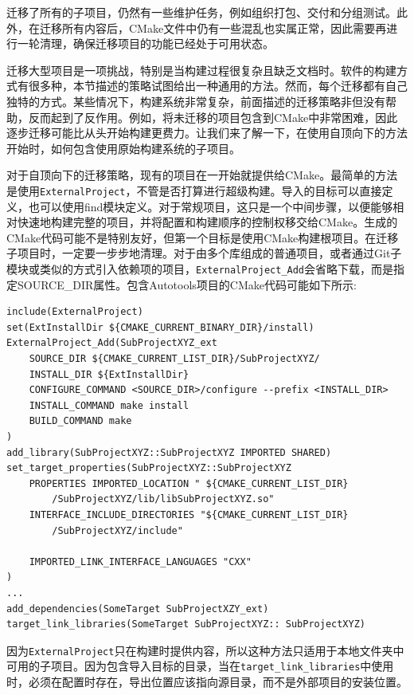 迁移了所有的子项目，仍然有一些维护任务，例如组织打包、交付和分组测试。此外，在迁移所有内容后，CMake文件中仍有一些混乱也实属正常，因此需要再进行一轮清理，确保迁移项目的功能已经处于可用状态。

迁移大型项目是一项挑战，特别是当构建过程很复杂且缺乏文档时。软件的构建方式有很多种，本节描述的策略试图给出一种通用的方法。然而，每个迁移都有自己独特的方式。某些情况下，构建系统非常复杂，前面描述的迁移策略非但没有帮助，反而起到了反作用。例如，将未迁移的项目包含到CMake中非常困难，因此逐步迁移可能比从头开始构建更费力。让我们来了解一下，在使用自顶向下的方法开始时，如何包含使用原始构建系统的子项目。


对于自顶向下的迁移策略，现有的项目在一开始就提供给CMake。最简单的方法是使用\texttt{ExternalProject}，不管是否打算进行超级构建。导入的目标可以直接定义，也可以使用find模块定义。对于常规项目，这只是一个中间步骤，以便能够相对快速地构建完整的项目，并将配置和构建顺序的控制权移交给CMake。生成的CMake代码可能不是特别友好，但第一个目标是使用CMake构建根项目。在迁移子项目时，一定要一步步地清理。对于由多个库组成的普通项目，或者通过Git子模块或类似的方式引入依赖项的项目，\texttt{ExternalProject\_Add}会省略下载，而是指定SOURCE\_DIR属性。包含Autotools项目的CMake代码可能如下所示:

\begin{lstlisting}[style=styleCMake]
include(ExternalProject)
set(ExtInstallDir ${CMAKE_CURRENT_BINARY_DIR}/install)
ExternalProject_Add(SubProjectXYZ_ext
	SOURCE_DIR ${CMAKE_CURRENT_LIST_DIR}/SubProjectXYZ/
	INSTALL_DIR ${ExtInstallDir}
	CONFIGURE_COMMAND <SOURCE_DIR>/configure --prefix <INSTALL_DIR>
	INSTALL_COMMAND make install
	BUILD_COMMAND make
)
add_library(SubProjectXYZ::SubProjectXYZ IMPORTED SHARED)
set_target_properties(SubProjectXYZ::SubProjectXYZ
	PROPERTIES IMPORTED_LOCATION " ${CMAKE_CURRENT_LIST_DIR}
		/SubProjectXYZ/lib/libSubProjectXYZ.so"
	INTERFACE_INCLUDE_DIRECTORIES "${CMAKE_CURRENT_LIST_DIR}
		/SubProjectXYZ/include"
	
	IMPORTED_LINK_INTERFACE_LANGUAGES "CXX"
)
...
add_dependencies(SomeTarget SubProjectXZY_ext)
target_link_libraries(SomeTarget SubProjectXYZ:: SubProjectXYZ)
\end{lstlisting}

因为\texttt{ExternalProject}只在构建时提供内容，所以这种方法只适用于本地文件夹中可用的子项目。因为包含导入目标的目录，当在\texttt{target\_link\_libraries}中使用时，必须在配置时存在，导出位置应该指向源目录，而不是外部项目的安装位置。

